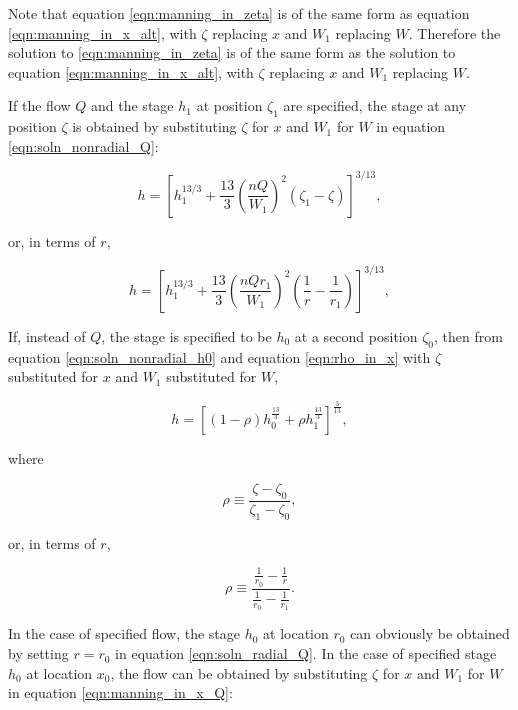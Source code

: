 \documentclass[fleqn]{article}
\begin{document}
\noindent Note that equation \ref{eqn:manning_in_zeta} is of the same form as equation \ref{eqn:manning_in_x_alt}, with $\zeta$ replacing $x$ and $W_{1}$ replacing $W$. Therefore the solution to \ref{eqn:manning_in_zeta} is of the same form as the solution to equation \ref{eqn:manning_in_x_alt}, with $\zeta$ replacing $x$ and $W_{1}$ replacing $W$.

If the flow $Q$ and the stage $h_{1}$ at position $\zeta_{1}$ are specified, the stage at any position $\zeta$ is obtained by substituting $\zeta$ for $x$ and $W_{1}$ for $W$ in equation \ref{eqn:soln_nonradial_Q}:

\begin{equation}
   h = \left [ h_{1}^{13/3}  + \frac{13}{3} \left ( \frac{n Q}{W_{1}} \right )^{2} \left (\zeta_{1} - \zeta \right ) \right ]^{3/13},
  \label{eqn:soln_radial_Q_zeta}
\end{equation}

\noindent or, in terms of $r$,

\begin{equation}
   h = \left [ h_{1}^{13/3}  + \frac{13}{3} \left ( \frac{n Q r_{1}}{W_{1}} \right )^{2} \left (\frac{1}{r} - \frac{1}{r_{1}} \right ) \right ]^{3/13},
  \label{eqn:soln_radial_Q}
\end{equation}

If, instead of $Q$, the stage is specified to be $h_{0}$ at a second position $\zeta_{0}$, then from equation \ref{eqn:soln_nonradial_h0} and equation \ref{eqn:rho_in_x} with $\zeta$ substituted for $x$  and $W_{1}$ substituted for $W$,

\begin{equation}
  h = \left [ \left (1 - \rho \right ) h^{\frac{13}{3}}_{0} + \rho h^{\frac{13}{3}}_{1} \right ]^{\frac{3}{13}} ,
  \label{eqn:soln_radial_h0}
\end{equation}

\noindent where 

\begin{equation}
  \rho \equiv \frac{\zeta - \zeta_{0}}{\zeta_{1} - \zeta_{0}} ,
  \label{eqn:rho_in_zeta}
\end{equation}

\noindent or, in terms of $r$,

\begin{equation}
  \rho \equiv \frac{\frac{1}{r_{0}} - \frac{1}{r}}{\frac{1}{r_{0}} - \frac{1}{r_{1}}} .
  \label{eqn:rho_in_r}
\end{equation}

In the case of specified flow, the stage $h_0$ at location $r_{0}$ can obviously be obtained by setting $r = r_{0}$ in equation \ref{eqn:soln_radial_Q}. In the case of specified stage $h_{0}$ at location $x_{0}$, the flow can be obtained by substituting $\zeta$ for $x$ and $W_{1}$ for $W$ in equation \ref{eqn:manning_in_x_Q}:
\end{document}
